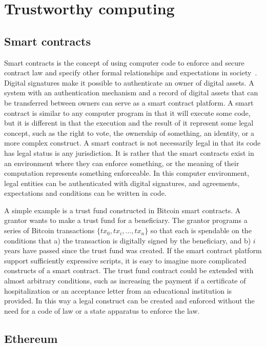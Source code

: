 \section{Trustworthy computing}
\label{sec:trustworthy}

\subsection{Smart contracts}

Smart contracts is the concept of using computer code to enforce and secure contract law and specify other formal relationships and expectations in  society~\cite{szabo_formalizing_1997}. Digital signatures make it possible to authenticate an owner of digital assets. A system with an authentication mechanism and a record of digital assets that can be transferred between owners can serve as a smart contract platform. A smart contract is similar to any computer program in that it will execute some code, but it is different in that the execution and the result of it represent some legal concept, such as the right to vote, the ownership of something, an identity, or a more complex construct. A smart contract is not necessarily legal in that its code has legal status is any jurisdiction. It is rather that the smart contracts exist in an environment where they can enforce something, or the meaning of their computation represents something enforceable. In this computer environment, legal entities can be authenticated with digital signatures, and agreements, expectations and conditions can be written in code.

A simple example is a trust fund constructed in Bitcoin smart contracts. A grantor wants to make a trust fund for a beneficiary. The grantor programs a series of Bitcoin transactions $\{tx_0, tx_i, ..., tx_n\}$ so that each is spendable on the conditions that a) the transaction is digitally signed by the beneficiary, and b) $i$ years have passed since the trust fund was created. If the smart contract platform support sufficiently expressive scripts, it is easy to imagine more complicated constructs of a smart contract. The trust fund contract could be extended with almost arbitrary conditions, such as increasing the payment if a certificate of hospitalization or an acceptance letter from an educational institution is provided. In this way a legal construct can be created and enforced without the need for a code of law or a state apparatus to enforce the law.

\subsection{Ethereum}

